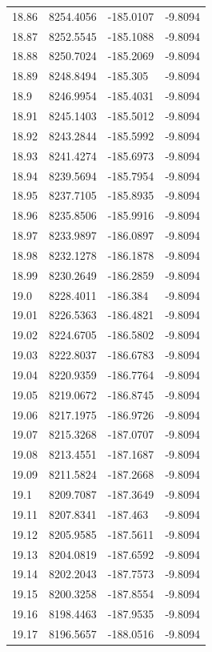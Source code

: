 \begin{table}[H]
\begin{tabular}{llll}
18.86 & 8254.4056 & -185.0107 & -9.8094 \\
18.87 & 8252.5545 & -185.1088 & -9.8094 \\
18.88 & 8250.7024 & -185.2069 & -9.8094 \\
18.89 & 8248.8494 & -185.305 & -9.8094 \\
18.9 & 8246.9954 & -185.4031 & -9.8094 \\
18.91 & 8245.1403 & -185.5012 & -9.8094 \\
18.92 & 8243.2844 & -185.5992 & -9.8094 \\
18.93 & 8241.4274 & -185.6973 & -9.8094 \\
18.94 & 8239.5694 & -185.7954 & -9.8094 \\
18.95 & 8237.7105 & -185.8935 & -9.8094 \\
18.96 & 8235.8506 & -185.9916 & -9.8094 \\
18.97 & 8233.9897 & -186.0897 & -9.8094 \\
18.98 & 8232.1278 & -186.1878 & -9.8094 \\
18.99 & 8230.2649 & -186.2859 & -9.8094 \\
19.0 & 8228.4011 & -186.384 & -9.8094 \\
19.01 & 8226.5363 & -186.4821 & -9.8094 \\
19.02 & 8224.6705 & -186.5802 & -9.8094 \\
19.03 & 8222.8037 & -186.6783 & -9.8094 \\
19.04 & 8220.9359 & -186.7764 & -9.8094 \\
19.05 & 8219.0672 & -186.8745 & -9.8094 \\
19.06 & 8217.1975 & -186.9726 & -9.8094 \\
19.07 & 8215.3268 & -187.0707 & -9.8094 \\
19.08 & 8213.4551 & -187.1687 & -9.8094 \\
19.09 & 8211.5824 & -187.2668 & -9.8094 \\
19.1 & 8209.7087 & -187.3649 & -9.8094 \\
19.11 & 8207.8341 & -187.463 & -9.8094 \\
19.12 & 8205.9585 & -187.5611 & -9.8094 \\
19.13 & 8204.0819 & -187.6592 & -9.8094 \\
19.14 & 8202.2043 & -187.7573 & -9.8094 \\
19.15 & 8200.3258 & -187.8554 & -9.8094 \\
19.16 & 8198.4463 & -187.9535 & -9.8094 \\
19.17 & 8196.5657 & -188.0516 & -9.8094 \\

\end{tabular}
\end{table}
